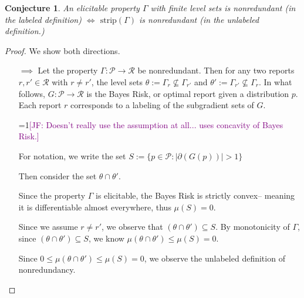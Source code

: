 \documentclass[12pt]{article}
\newcommand{\Comments}{1}
\newcommand{\mynote}[2]{\ifnum\Comments=1\textcolor{#1}{#2}\fi}
\newcommand{\jessie}[1]{\mynote{purple}{[JF: #1]}}
\renewcommand{\P}{\mathcal{P}}
\newcommand{\R}{\mathcal{R}}
\newcommand{\inter}[1]{\mathring{#1}}%
\newcommand{\strip}{\mathrm{strip}}
\newtheorem{conjecture}{Conjecture}
\begin{document}
\begin{conjecture}\label{conj:nonredundant-defs-equivalent}
	An elicitable property $\Gamma$ with finite level sets is nonredundant (in the labeled definition) $\iff$ $\strip(\Gamma)$ is nonredundant (in the unlabeled definition.)
\end{conjecture}
\begin{proof}
	We show both directions.\\
	\begin{enumerate}
		\item [$\implies$]
		Let the property $\Gamma:\P \to \R$ be nonredundant.
		Then for any two reports $r, r' \in \R$ with $r \neq r'$, the level sets $\theta := \Gamma_r \not \subseteq \Gamma_{r'}$ and $\theta' := \Gamma_{r'} \not \subseteq \Gamma_r$.
		In what follows, $G : \P \to \R$ is the Bayes Risk, or optimal report given a distribution $p$.
		Each report $r$ corresponds to a labeling of the subgradient sets of $G$.
		
		\jessie{Doesn't really use the assumption at all... uses concavity of Bayes Risk.}
		
		For notation, we write the set $S := \{p \in \P : |\partial(G(p))| > 1\}$
		
		Then consider the set $\theta \cap \theta'$.
		

		
		Since the property $\Gamma$ is elicitable, the Bayes Risk is strictly convex-- meaning it is differentiable almost everywhere, thus $\mu(S) = 0$.
		
		Since we assume $r \neq r'$, we observe that $(\theta\cap\theta') \subseteq S$.
		By monotonicity of $\Gamma$, since $(\theta\cap\theta') \subseteq S$, we know $\mu(\theta \cap \theta') \leq \mu(S) = 0$.
		

		Since $0 \leq \mu(\theta \cap \theta') \leq \mu(S) = 0$, we observe the unlabeled definition of nonredundancy.
		

\end{enumerate}
\end{proof}
\end{document}
